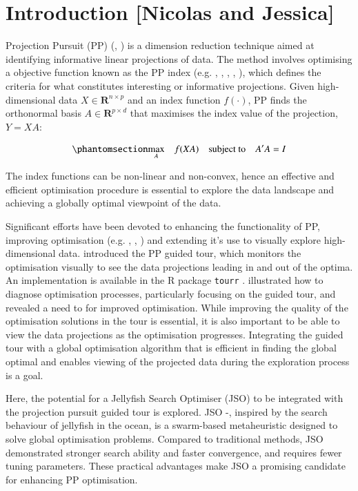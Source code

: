\documentclass[
  number,
  preprint,
  3p]{elsarticle}
\begin{document}
\section{Introduction {[}Nicolas and
Jessica{]}}\label{introduction-nicolas-and-jessica}

Projection Pursuit (PP) (\citet{kr69}, \citet{FT74}) is a dimension
reduction technique aimed at identifying informative linear projections
of data. The method involves optimising a objective function known as
the PP index (e.g. \citet{hall1989polynomial},
\citet{cook1993projection}, \citet{lee2010projection},
\citet{Loperfido2018}, \citet{Loperfido2020}), which defines the
criteria for what constitutes interesting or informative projections.
Given high-dimensional data \(X \in \mathbf{R}^{n\times p}\) and an
index function \(f(\cdot)\), PP finds the orthonormal basis
\(A \in \mathbf{R}^{p \times d}\) that maximises the index value of the
projection, \(Y = XA\):

\begin{equation}\phantomsection\label{eq-optimization}{
\underset{A}{\max } \quad f(XA) \quad \text{subject to} \quad A'A = I
}\end{equation}

The index functions can be non-linear and non-convex, hence an effective
and efficient optimisation procedure is essential to explore the data
landscape and achieving a globally optimal viewpoint of the data.

Significant efforts have been devoted to enhancing the functionality of
PP, improving optimisation (e.g. \citet{posse1995},
\citet{marie-sainte2010}, \citet{grochowski2011}) and extending it's use
to visually explore high-dimensional data. \citet{cook1995grand}
introduced the PP guided tour, which monitors the optimisation visually
to see the data projections leading in and out of the optima. An
implementation is available in the R \citep{R} package \texttt{tourr}
\citep{tourr}. \citet{RJ-2021-105} illustrated how to diagnose
optimisation processes, particularly focusing on the guided tour, and
revealed a need to for improved optimisation. While improving the
quality of the optimisation solutions in the tour is essential, it is
also important to be able to view the data projections as the
optimisation progresses. Integrating the guided tour with a global
optimisation algorithm that is efficient in finding the global optimal
and enables viewing of the projected data during the exploration process
is a goal.

Here, the potential for a Jellyfish Search Optimiser (JSO) to be
integrated with the projection pursuit guided tour is explored. JSO
\citep{chou_novel_2021} -\citep{rajwar_exhaustive_2023}, inspired by the
search behaviour of jellyfish in the ocean, is a swarm-based
metaheuristic designed to solve global optimisation problems. Compared
to traditional methods, JSO demonstrated stronger search ability and
faster convergence, and requires fewer tuning parameters. These
practical advantages make JSO a promising candidate for enhancing PP
optimisation.
\end{document}
